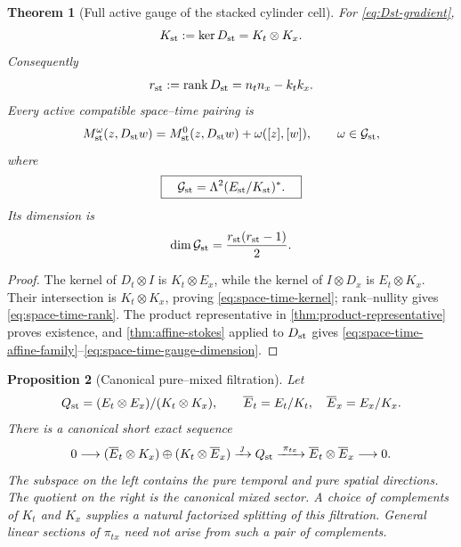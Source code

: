 \documentclass[11pt,a4paper]{article}
\newtheorem{theorem}{Theorem}[section]
\newtheorem{proposition}[theorem]{Proposition}
\begin{document}
\begin{theorem}[Full active gauge of the stacked cylinder cell]
\label{thm:space-time-gauge}
For \cref{eq:Dst-gradient},
\begin{equation}\label{eq:space-time-kernel}
 K_{\rm st}:=\ker D_{\rm st}=K_t\otimes K_x.
\end{equation}
Consequently
\begin{equation}\label{eq:space-time-rank}
 r_{\rm st}:=\operatorname{rank}D_{\rm st}
 =n_tn_x-k_tk_x.
\end{equation}
Every active compatible space--time pairing is
\begin{equation}\label{eq:space-time-affine-family}
 M_{\rm st}^{\omega}(z,D_{\rm st}w)
 =M_{\rm st}^0(z,D_{\rm st}w)+\omega([z],[w]),
 \qquad
 \omega\in\mathcal G_{\rm st},
\end{equation}
where
\begin{equation}\label{eq:intrinsic-space-time-gauge}
 \boxed{\quad
 \mathcal G_{\rm st}
 =\Lambda^2(E_{\rm st}/K_{\rm st})^*.
 \quad}
\end{equation}
Its dimension is
\begin{equation}\label{eq:space-time-gauge-dimension}
 \dim\mathcal G_{\rm st}
 =\frac{r_{\rm st}(r_{\rm st}-1)}2.
\end{equation}
\end{theorem}

\begin{proof}
The kernel of \(D_t\otimes I\) is \(K_t\otimes E_x\), while the kernel
of \(I\otimes D_x\) is \(E_t\otimes K_x\).  Their intersection is
\(K_t\otimes K_x\), proving \cref{eq:space-time-kernel}; rank--nullity
gives \cref{eq:space-time-rank}.  The product representative in
\cref{thm:product-representative} proves existence, and
\cref{thm:affine-stokes} applied to \(D_{\rm st}\) gives
\cref{eq:space-time-affine-family}--\cref{eq:space-time-gauge-dimension}.
\end{proof}

\begin{proposition}[Canonical pure--mixed filtration]
\label{prop:canonical-sector-sequence}
Let
\[
 Q_{\rm st}=(E_t\otimes E_x)/(K_t\otimes K_x),\qquad
 \overline E_t=E_t/K_t,\quad \overline E_x=E_x/K_x.
\]
There is a canonical short exact sequence
\begin{equation}\label{eq:canonical-sector-sequence}
 0\longrightarrow
 (\overline E_t\otimes K_x)\oplus(K_t\otimes\overline E_x)
 \xrightarrow{\;\jmath\;}Q_{\rm st}
 \xrightarrow{\;\pi_{tx}\;}
 \overline E_t\otimes\overline E_x
 \longrightarrow0.
\end{equation}
The subspace on the left contains the pure temporal and pure spatial
directions.  The quotient on the right is the canonical mixed sector.
A choice of complements of \(K_t\) and \(K_x\) supplies a natural
factorized splitting of this filtration.  General linear sections of
\(\pi_{tx}\) need not arise from such a pair of complements.
\end{proposition}
\end{document}
